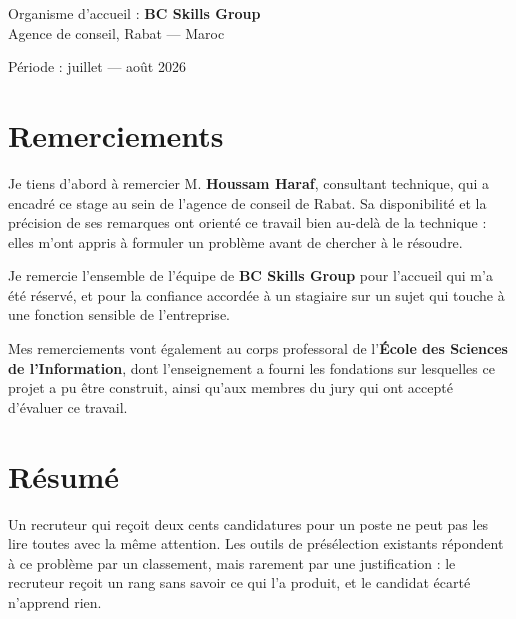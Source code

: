 \documentclass[12pt,a4paper]{report}
\begin{document}
\begin{titlepage}
\begin{center}
\vfill
{\large Organisme d'accueil : \textbf{BC Skills Group}\\
Agence de conseil, Rabat --- Maroc\par}
\vspace{0.3cm}
{\large Période : juillet --- août 2026\par}

\end{center}
\end{titlepage}

\chapter*{Remerciements}

Je tiens d'abord à remercier M. \textbf{Houssam Haraf}, consultant technique,
qui a encadré ce stage au sein de l'agence de conseil de Rabat. Sa disponibilité et la précision de
ses remarques ont orienté ce travail bien au-delà de la technique : elles
m'ont appris à formuler un problème avant de chercher à le résoudre.

Je remercie l'ensemble de l'équipe de \textbf{BC Skills Group} pour l'accueil
qui m'a été réservé, et pour la confiance accordée à un stagiaire sur un
sujet qui touche à une fonction sensible de l'entreprise.

Mes remerciements vont également au corps professoral de l'\textbf{École des
Sciences de l'Information}, dont l'enseignement a fourni les fondations sur
lesquelles ce projet a pu être construit, ainsi qu'aux membres du jury qui
ont accepté d'évaluer ce travail.

\chapter*{Résumé}

Un recruteur qui reçoit deux cents candidatures pour un poste ne peut pas les
lire toutes avec la même attention. Les outils de présélection existants
répondent à ce problème par un classement, mais rarement par une
justification : le recruteur reçoit un rang sans savoir ce qui l'a produit, et
le candidat écarté n'apprend rien.
\end{document}
